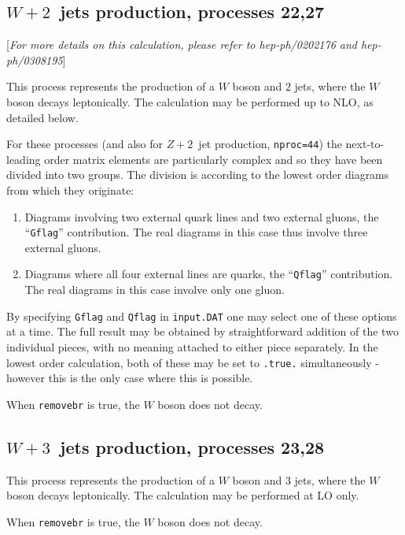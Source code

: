 \documentclass[12pt]{article}
\begin{document}
\subsection{$W+2$~jets production, processes 22,27}
\label{subsec:w2jets}

\begin{center}
[{\it For more details on this calculation, please refer to \break
 hep-ph/0202176 and hep-ph/0308195}]
\end{center}
This process represents the production of a $W$ boson and $2$ jets,
where the $W$ boson decays leptonically. The calculation may be
performed up to NLO, as detailed below.

For these processes (and also for $Z+2$~jet production, {\tt nproc=44})
the next-to-leading order matrix elements are
particularly complex and so they have been divided into two groups.
The division is according to the lowest order diagrams from which they
originate:
\begin{enumerate}
\item Diagrams involving two external quark lines and two external gluons,
the ``{\tt Gflag}'' contribution. The real diagrams in this case thus
involve three external gluons.

\item Diagrams where all four external lines are quarks,
the ``{\tt Qflag}'' contribution. The real diagrams in this case 
involve only one gluon.
\end{enumerate}

By specifying {\tt Gflag} and {\tt Qflag} in {\tt input.DAT} one may
select one of these options at a time. The full result may be obtained
by straightforward addition of the two individual pieces, with no
meaning attached to either piece separately. In the lowest order calculation,
both of these may be set to {\tt .true.} simultaneously - however this is
the only case where this is possible.

When {\tt removebr} is true, the $W$ boson does not decay.

\subsection{$W+3$~jets production, processes 23,28}
\label{subsec:w3jets}

This process represents the production of a $W$ boson and $3$ jets,
where the $W$ boson decays leptonically. The calculation may be
performed at LO only.

When {\tt removebr} is true, the $W$ boson does not decay.
\end{document}

